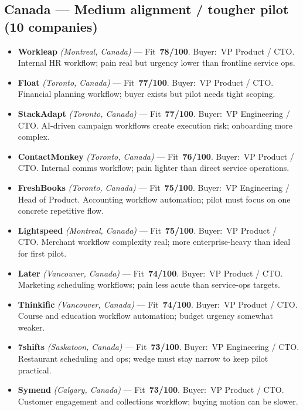 \documentclass[10pt]{article}
\newcommand{\cand}[5]{\item \textbf{#1} \textit{(#2)} --- Fit~\textbf{#3/100}. Buyer:~#4. #5}
\begin{document}
\subsection{Canada --- Medium alignment / tougher pilot (10 companies)}
\begin{itemize}
\cand{Workleap}{Montreal, Canada}{78}{VP Product / CTO}{Internal HR workflow; pain real but urgency lower than frontline service ops.}
\cand{Float}{Toronto, Canada}{77}{VP Product / CTO}{Financial planning workflow; buyer exists but pilot needs tight scoping.}
\cand{StackAdapt}{Toronto, Canada}{77}{VP Engineering / CTO}{AI-driven campaign workflows create execution risk; onboarding more complex.}
\cand{ContactMonkey}{Toronto, Canada}{76}{VP Product / CTO}{Internal comms workflow; pain lighter than direct service operations.}
\cand{FreshBooks}{Toronto, Canada}{75}{VP Engineering / Head of Product}{Accounting workflow automation; pilot must focus on one concrete repetitive flow.}
\cand{Lightspeed}{Montreal, Canada}{75}{VP Product / CTO}{Merchant workflow complexity real; more enterprise-heavy than ideal for first pilot.}
\cand{Later}{Vancouver, Canada}{74}{VP Product / CTO}{Marketing scheduling workflows; pain less acute than service-ops targets.}
\cand{Thinkific}{Vancouver, Canada}{74}{VP Product / CTO}{Course and education workflow automation; budget urgency somewhat weaker.}
\cand{7shifts}{Saskatoon, Canada}{73}{VP Engineering / CTO}{Restaurant scheduling and ops; wedge must stay narrow to keep pilot practical.}
\cand{Symend}{Calgary, Canada}{73}{VP Product / CTO}{Customer engagement and collections workflow; buying motion can be slower.}
\end{itemize}
\end{document}
